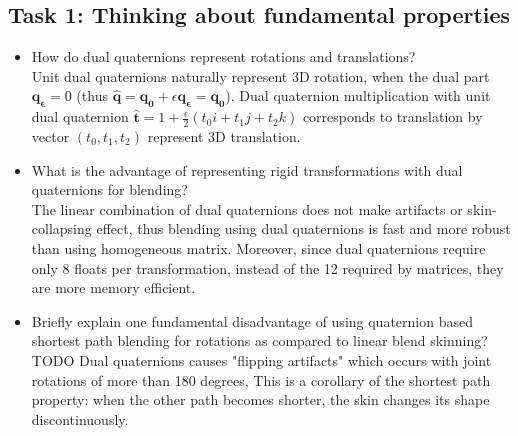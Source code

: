 \documentclass[paper=a4, fontsize=11pt]{scrartcl} %
\numberwithin{equation}{section} %
\numberwithin{figure}{section} %
\numberwithin{table}{section} %
\renewcommand{\vec}[1]{\mathbf{#1}}
\begin{document}
\subsection{Task 1: Thinking about fundamental properties}

\begin{itemize}
	\item How do dual quaternions represent rotations and translations? \\

Unit dual quaternions naturally represent 3D rotation, when the dual part $\vec{q_\epsilon} = 0$ (thus $\hat{\vec{q}} = \vec{q_0} + \epsilon \vec{q_\epsilon} = \vec{q_0}$). Dual quaternion multiplication with unit dual quaternion $\hat{\vec{t}} = 1 + \frac{\epsilon}{2}(t_0 i + t_1 j + t_2 k)$ corresponds to translation by vector $(t_0, t_1, t_2)$ represent 3D translation.\\
	
	\item What is the advantage of representing rigid transformations with dual quaternions for blending? \\
	
The linear combination of dual quaternions does not make artifacts or skin-collapsing effect, thus blending using dual quaternions is fast and more robust than using homogeneous matrix. Moreover, since dual quaternions require only 8 floats per transformation, instead of the 12 required by matrices, they are more memory efficient.\\
	
	\item Briefly explain one fundamental disadvantage of using quaternion based shortest path blending for rotations as compared to linear blend skinning? \\
	
TODO 
Dual quaternions causes "flipping artifacts" which occurs with joint rotations of more than 180 degrees, This is a corollary of the shortest path property: when the other path becomes shorter, the skin changes its shape discontinuously. \\

\end{itemize}


\end{document}
